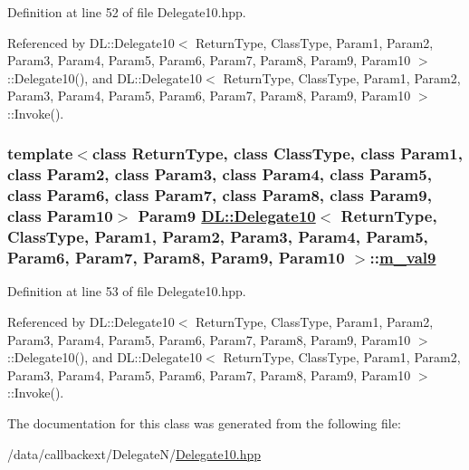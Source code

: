 Definition at line 52 of file Delegate10.hpp.

Referenced by DL::Delegate10$<$ Return\-Type, Class\-Type, Param1, Param2, Param3, Param4, Param5, Param6, Param7, Param8, Param9, Param10 $>$::Delegate10(), and DL::Delegate10$<$ Return\-Type, Class\-Type, Param1, Param2, Param3, Param4, Param5, Param6, Param7, Param8, Param9, Param10 $>$::Invoke().\hypertarget{classDL_1_1Delegate10_r10}{
\subsubsection[m\_\-val9]{\setlength{\rightskip}{0pt plus 5cm}template$<$class Return\-Type, class Class\-Type, class Param1, class Param2, class Param3, class Param4, class Param5, class Param6, class Param7, class Param8, class Param9, class Param10$>$ Param9 \hyperlink{classDL_1_1Delegate10}{DL::Delegate10}$<$ Return\-Type, Class\-Type, Param1, Param2, Param3, Param4, Param5, Param6, Param7, Param8, Param9, Param10 $>$::\hyperlink{classDL_1_1Delegate10_r10}{m\_\-val9}}}
\label{classDL_1_1Delegate10_r10}




Definition at line 53 of file Delegate10.hpp.

Referenced by DL::Delegate10$<$ Return\-Type, Class\-Type, Param1, Param2, Param3, Param4, Param5, Param6, Param7, Param8, Param9, Param10 $>$::Delegate10(), and DL::Delegate10$<$ Return\-Type, Class\-Type, Param1, Param2, Param3, Param4, Param5, Param6, Param7, Param8, Param9, Param10 $>$::Invoke().

The documentation for this class was generated from the following file:\begin{CompactItemize}
\item 
/data/callbackext/Delegate\-N/\hyperlink{Delegate10_8hpp}{Delegate10.hpp}\end{CompactItemize}
